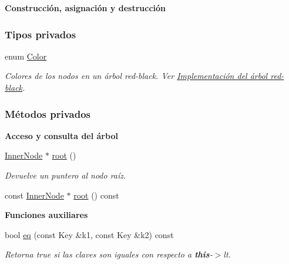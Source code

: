 \begin{Indent}{\bf \-Construcción, asignación y destrucción}
\subsubsection*{\-Tipos privados}
\begin{DoxyCompactItemize}
\item 
enum \hyperlink{classaed2_1_1iterator_aaa188f82ba585d8de525b1400242cf4f_aaa188f82ba585d8de525b1400242cf4f}{\-Color} 
\begin{DoxyCompactList}\small\item\em \-Colores de los nodos en un árbol red-\/black. \-Ver \hyperlink{Implementacion}{\-Implementación del árbol red-\/black}. \end{DoxyCompactList}\end{DoxyCompactItemize}
\subsubsection*{\-Métodos privados}
\begin{Indent}{\bf \-Acceso y consulta del árbol}\par
\begin{DoxyCompactItemize}
\item 
\hyperlink{structaed2_1_1iterator_1_1InnerNode}{\-Inner\-Node} $\ast$ \hyperlink{classaed2_1_1iterator_aa442801bed510f7fde94e14bafada8a1_aa442801bed510f7fde94e14bafada8a1}{root} ()
\begin{DoxyCompactList}\small\item\em \-Devuelve un puntero al nodo raíz. \end{DoxyCompactList}\item 
const \hyperlink{structaed2_1_1iterator_1_1InnerNode}{\-Inner\-Node} $\ast$ \hyperlink{classaed2_1_1iterator_a888c520c5a85d62a8ce2159c6d22e439_a888c520c5a85d62a8ce2159c6d22e439}{root} () const 
\end{DoxyCompactItemize}
\end{Indent}
\begin{Indent}{\bf \-Funciones auxiliares}\par
\begin{DoxyCompactItemize}
\item 
bool \hyperlink{classaed2_1_1iterator_a0f44ecfde1e6a5dce5e37c0779ffefb7_a0f44ecfde1e6a5dce5e37c0779ffefb7}{eq} (const \-Key \&k1, const \-Key \&k2) const 
\begin{DoxyCompactList}\small\item\em \-Retorna true si las claves son iguales con respecto a {\bfseries this}-\/$>$lt. \end{DoxyCompactList}\end{DoxyCompactItemize}
\end{Indent}

\end{Indent}
